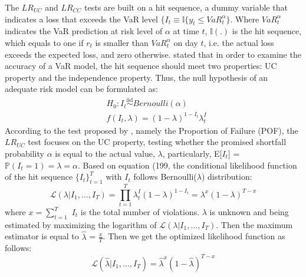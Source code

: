 \documentclass[12pt,a4paper]{article}
\begin{document}
The $LR_{UC}$ and $LR_{CC}$ tests are built on a hit sequence, a dummy variable that indicates a loss that exceeds the VaR level $\{I_t \equiv \mathbb{I} \{y_t \leq VaR^\alpha_t\}$. Where $VaR^\alpha_t$ indicates the VaR prediction at risk level of $\alpha$ at time $t$, $\mathbb{I}(.)$ is the hit sequence, which equals to one if $r_t$ is smaller than $VaR^\alpha_t$ on day $t$, i.e. the actual loss exceeds the expected loss, and zero otherwise. \cite{christoffersen1998evaluating} stated that in order to examine the accuracy of a VaR model, the hit sequence should meet two properties: UC property and the independence property. Thus, the null hypothesis of an adequate risk model can be formulated as:
\begin{align}
	& H_0: I_t \overset{\mathrm{iid}}{\sim} Bernoulli(\alpha) \\
	& f(I_t, \lambda) = (1-\lambda)^{1-I_t} \lambda ^I_t
\end{align}
According to the test proposed by \cite{kupiec1995techniques}, namely the Proportion of Failure (POF), the $LR_{UC}$ test focuses on the UC property, testing whether the promised shortfall probability $\alpha$ is equal to the actual value, $\lambda$, particularly, E[$I_t$] = $\mathbb{P}(I_t = 1) = \lambda = \alpha$. Based on equation (199, the conditional likelihood function of the hit sequence $\{I_t\}^T_{t=1}$ with $I_t$ follows Bernoulli($\lambda$) distribution:
\begin{equation}
	\mathcal{L} (\lambda \vert I_1, \ldots, I_T) = \prod^T_{t=1} \lambda^I_t (1-\lambda)^{1-I_t} = \lambda^x (1-\lambda)^{T-x}
\end{equation}
where $x = \sum^T_{t=1}$ $I_t$ is the total number of violations. $\lambda$ is unknown and being estimated by maximizing the logarithm of $\mathcal{L}(\lambda \vert I_1, \ldots, I_T)$. Then the maximum estimator is equal to $\hat{\lambda}$ = $\frac{x}T$. Then we get the optimized likelihood function as follows:
\begin{equation}
	\mathcal{L} (\hat{\lambda} \vert I_1, \ldots, I_T) = \hat{\lambda}^x (1-\hat{\lambda})^{T-x}
\end{equation}
\end{document}
